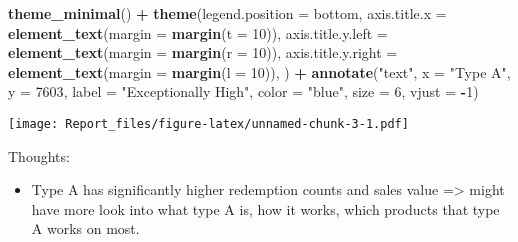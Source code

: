 \documentclass[
]{article}
\newenvironment{Shaded}{\begin{snugshade}}{\end{snugshade}}
\newcommand{\AttributeTok}[1]{\textcolor[rgb]{0.13,0.29,0.53}{#1}}
\newcommand{\DecValTok}[1]{\textcolor[rgb]{0.00,0.00,0.81}{#1}}
\newcommand{\FunctionTok}[1]{\textcolor[rgb]{0.13,0.29,0.53}{\textbf{#1}}}
\newcommand{\NormalTok}[1]{#1}
\newcommand{\SpecialCharTok}[1]{\textcolor[rgb]{0.81,0.36,0.00}{\textbf{#1}}}
\newcommand{\StringTok}[1]{\textcolor[rgb]{0.31,0.60,0.02}{#1}}
\providecommand{\tightlist}{%
  \setlength{\itemsep}{0pt}\setlength{\parskip}{0pt}}
\begin{document}
\begin{Shaded}
\begin{Highlighting}[]
  \FunctionTok{theme\_minimal}\NormalTok{() }\SpecialCharTok{+} 
  \FunctionTok{theme}\NormalTok{(}\AttributeTok{legend.position =} \StringTok{\textquotesingle{}bottom\textquotesingle{}}\NormalTok{,}
        \AttributeTok{axis.title.x =} \FunctionTok{element\_text}\NormalTok{(}\AttributeTok{margin =} \FunctionTok{margin}\NormalTok{(}\AttributeTok{t =} \DecValTok{10}\NormalTok{)),}
        \AttributeTok{axis.title.y.left =} \FunctionTok{element\_text}\NormalTok{(}\AttributeTok{margin =} \FunctionTok{margin}\NormalTok{(}\AttributeTok{r =} \DecValTok{10}\NormalTok{)),}
        \AttributeTok{axis.title.y.right =} \FunctionTok{element\_text}\NormalTok{(}\AttributeTok{margin =} \FunctionTok{margin}\NormalTok{(}\AttributeTok{l =} \DecValTok{10}\NormalTok{)),}
\NormalTok{        ) }\SpecialCharTok{+}
  \FunctionTok{annotate}\NormalTok{(}\StringTok{"text"}\NormalTok{, }\AttributeTok{x =} \StringTok{"Type A"}\NormalTok{, }\AttributeTok{y =} \DecValTok{7603}\NormalTok{, }\AttributeTok{label =} \StringTok{"Exceptionally High"}\NormalTok{, }\AttributeTok{color =} \StringTok{"blue"}\NormalTok{, }\AttributeTok{size =} \DecValTok{6}\NormalTok{, }\AttributeTok{vjust =} \SpecialCharTok{{-}}\DecValTok{1}\NormalTok{)}
\end{Highlighting}
\end{Shaded}

\texttt{[image: Report\_files/figure-latex/unnamed-chunk-3-1.pdf]}

Thoughts:

\begin{itemize}
\tightlist
\item
  Type A has significantly higher redemption counts and sales value
  =\textgreater{} might have more look into what type A is, how it
  works, which products that type A works on most.
\end{itemize}
\end{document}
